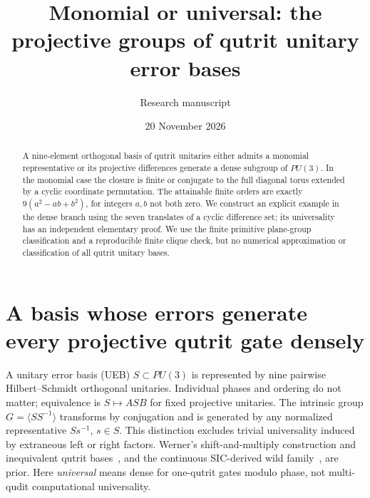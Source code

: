 \documentclass[10pt]{article}
\title{Monomial or universal: the projective groups of qutrit unitary error bases}
\author{Research manuscript}\date{20 November 2026}
\begin{document}
\maketitle
\begin{abstract}\noindent A nine-element orthogonal basis of qutrit unitaries either admits a monomial representative or its projective differences generate a dense subgroup of $PU(3)$. In the monomial case the closure is finite or conjugate to the full diagonal torus extended by a cyclic coordinate permutation. The attainable finite orders are exactly $9(a^2-ab+b^2)$, for integers $a,b$ not both zero. We construct an explicit example in the dense branch using the seven translates of a cyclic difference set; its universality has an independent elementary proof. We use the finite primitive plane-group classification and a reproducible finite clique check, but no numerical approximation or classification of all qutrit unitary bases.
\end{abstract}
\section{A basis whose errors generate every projective qutrit gate densely}
A unitary error basis (UEB) $S\subset PU(3)$ is represented by nine pairwise Hilbert--Schmidt orthogonal unitaries. Individual phases and ordering do not matter; equivalence is $S\mapsto ASB$ for fixed projective unitaries. The intrinsic group $G=\langle SS^{-1}\rangle$ transforms by conjugation and is generated by any normalized representative $S s^{-1}$, $s\in S$. This distinction excludes trivial universality induced by extraneous left or right factors. Werner's shift-and-multiply construction and inequivalent qutrit bases~\cite{Werner,Nayak}, and the continuous SIC-derived wild family~\cite{S}, are prior. Here \emph{universal} means dense for one-qutrit gates modulo phase, not multi-qudit computational universality.
\end{document}
